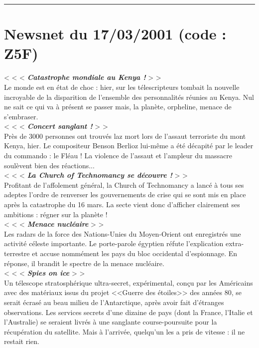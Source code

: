 \documentclass[11pt,twoside,a4paper]{book}
\begin{document}
\hrule

\clearpage

\section*{Newsnet du 17/03/2001 (code : Z5F)}

< < <  \textbf{\textit{Catastrophe mondiale au Kenya !}} > >~\\
Le monde est en {\'e}tat de choc : hier, sur les t{\'e}lescripteurs tombait la nouvelle incroyable de la disparition de l'ensemble des personnalit{\'e}s r{\'e}unies au Kenya. Nul ne sait ce qui va {\`a} pr{\'e}sent se passer mais, la plan{\`e}te, orpheline, menace de s'embraser.~\\
< < <  \textbf{\textit{Concert sanglant !}} > >~\\
Pr{\`e}s de 3000 personnes ont trouv{\'e}s laz mort lors de l'assaut terroriste du mont Kenya, hier. Le compositeur Benson Berlioz lui-m{\^e}me a {\'e}t{\'e} d{\'e}capit{\'e} par le leader du commando : le Fl{\'e}au ! La violence de l'assaut et l'ampleur du massacre soul{\`e}vent bien des r{\'e}actions...~\\
< < <  \textbf{\textit{La Church of Technomancy se d{\'e}couvre !}} > >~\\
Profitant de l'affolement g{\'e}n{\'e}ral, la Church of Technomancy a lanc{\'e} {\`a} tous ses adeptes l'ordre de renverser les gouvernements de crise qui se sont mis en place apr{\`e}s la catastrophe du 16 mars. La secte vient donc d'afficher clairement ses ambitions : r{\'e}gner sur la plan{\`e}te !~\\
< < <  \textbf{\textit{Menace nucl{\'e}aire}} > >~\\
Les radars de la force des Nations-Unies du Moyen-Orient ont enregistr{\'e}s une activit{\'e} c{\'e}leste importante. Le porte-parole {\'e}gyptien r{\'e}fute l'explication extra-terrestre et accuse nomm{\'e}ment les pays du bloc occidental d'espionnage. En r{\'e}ponse, il brandit le spectre de la menace nucl{\'e}aire.~\\
< < <  \textbf{\textit{Spies on ice}} > >~\\
Un t{\'e}lescope stratosph{\'e}rique ultra-secret, exp{\'e}rimental, con\c{c}u par les Am{\'e}ricains avec des mat{\'e}riaux issus du projet <<Guerre des {\'e}toiles>> des ann{\'e}es 80, se serait {\'e}cras{\'e} au beau milieu de l'Antarctique, apr{\`e}s avoir fait d'{\'e}tranges observations. Les services secrets d'une dizaine de pays (dont la France, l'Italie et l'Australie) se seraient livr{\'e}s {\`a} une sanglante course-poursuite pour la r{\'e}cup{\'e}ration du satellite. Mais {\`a} l'arriv{\'e}e, quelqu'un les a pris de vitesse : il ne restait rien.~\\
\end{document}
